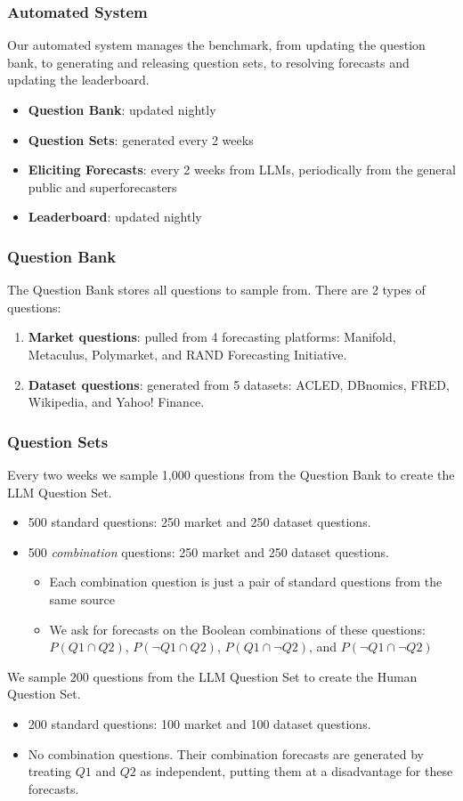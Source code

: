 \documentclass[aspectratio=169]{beamer}
\begin{document}
\begin{frame}
  \frametitle{Automated System}
  Our automated system manages the benchmark, from updating the question bank, to generating and releasing question sets, to resolving forecasts and updating the leaderboard.
  \begin{itemize}
  \item \textbf{Question Bank}: updated nightly
  \item \textbf{Question Sets}: generated every 2 weeks
  \item \textbf{Eliciting Forecasts}: every 2 weeks from LLMs, periodically from the general public and superforecasters
  \item \textbf{Leaderboard}: updated nightly
  \end{itemize}
\end{frame}




\begin{frame}
  \frametitle{Question Bank}
  The Question Bank stores all questions to sample from. There are 2 types of questions:
  \begin{enumerate}
  \item \textbf{Market questions}: pulled from 4 forecasting platforms: Manifold, Metaculus, Polymarket, and RAND Forecasting Initiative.
    \item \textbf{Dataset questions}: generated from 5 datasets: ACLED, DBnomics, FRED, Wikipedia, and Yahoo! Finance.
  \end{enumerate}

\end{frame}


\begin{frame}
  \frametitle{Question Sets}
  Every two weeks we sample 1,000 questions from the Question Bank to create the LLM Question Set.
  \begin{itemize}
  \item 500 standard questions: 250 market and 250 dataset questions.
  \item 500 \textit{combination} questions: 250 market and 250 dataset questions.
    \begin{itemize}
      \item Each combination question is just a pair of standard questions from the same source
      \item We ask for forecasts on the Boolean combinations of these questions: $P(Q1\cap Q2)$, $P(\neg Q1\cap Q2)$, $P(Q1\cap \neg Q2)$, and $P(\neg Q1\cap \neg Q2)$
    \end{itemize}
  \end{itemize}

  We sample 200 questions from the LLM Question Set to create the Human Question Set.
  \begin{itemize}
  \item 200 standard questions: 100 market and 100 dataset questions.
  \item No combination questions. Their combination forecasts are generated by treating $Q1$ and $Q2$ as independent, putting them at a disadvantage for these forecasts.
  \end{itemize}

\end{frame}
\end{document}
